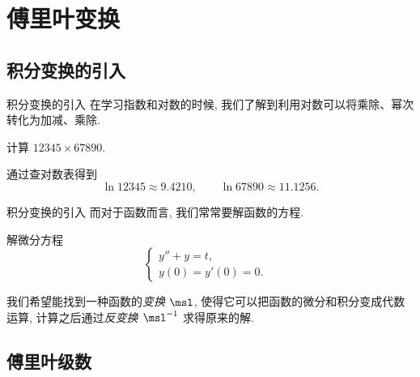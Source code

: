 \section{傅里叶变换}

\subsection{积分变换的引入}

\begin{frame}{积分变换的引入}
	\onslide<+->
	在学习指数和对数的时候, 我们了解到利用对数可以将乘除、幂次转化为加减、乘除.
	\onslide<+->
	\begin{example}[nearnext]
		计算 $12345\times 67890$.
	\end{example}
	\onslide<+->
	\begin{solution}[nearprev]
		通过查对数表得到
		\[
			\ln 12345\approx 9.4210,\qquad\ln 67890\approx 11.1256.
		\]
		\bigdel
	\end{solution}
\end{frame}


\begin{frame}{积分变换的引入}
	\onslide<+->
	而对于函数而言, 我们常常要解函数的方程.
	\onslide<+->
	\begin{example}[nearnext]
		解微分方程
		\[
			\begin{cases}
				y''+y=t,&\\
				y(0)=y'(0)=0.&
			\end{cases}
		\]
	\end{example}
	\onslide<+->
	\begin{solution}
		我们希望能找到一种函数的\emph{变换 $\msl$}, 使得它可以把函数的微分和积分变成代数运算, 计算之后通过\emph{反变换 $\msl^{-1}$} 求得原来的解.

	\end{solution}
\end{frame}


\subsection{傅里叶级数}

